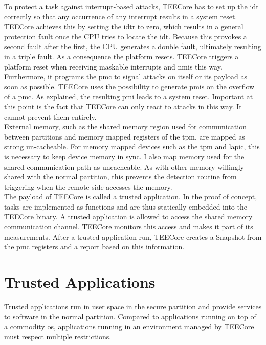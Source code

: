 To protect a task against interrupt-based attacks, TEECore has to set up the
\gls{idt} correctly so that any occurrence of any interrupt results in a system
reset. TEECore achieves this by setting the \gls{idtr} to zero, which results in
a general protection fault once the CPU tries to locate the \gls{idt}. Because
this provokes a second fault after the first, the CPU generates a double fault,
ultimately resulting in a triple fault. As a consequence the platform resets.
TEECore triggers a platform reset when receiving maskable interrupts and
\glspl{nmi} this way. Furthermore, it programs the \gls{pmc} to signal attacks
on itself or its payload as soon as possible. TEECore uses the possibility to
generate \glspl{pmi} on the overflow of a \gls{pmc}. As explained, the resulting
\gls{pmi} leads to a system reset. Important at this point is the fact that
TEECore can only react to attacks in this way. It cannot prevent them
entirely.\\

External memory, such as the shared memory region used for communication between
partitions and memory mapped registers of the \gls{tpm}, are mapped as strong
un-cacheable. For memory mapped devices such as the \gls{tpm} and \gls{lapic},
this is necessary to keep device memory in sync. I also map memory used for the
shared communication path as uncacheable. As with other memory willingly shared
with the normal partition, this prevents the detection routine from triggering
when the remote side accesses the memory.\\

The payload of TEECore is called a trusted application. In the proof of concept,
tasks are implemented as functions and are thus statically embedded into the
TEECore binary. A trusted application is allowed to access the shared memory
communication channel. TEECore monitors this access and makes it part of its
measurements. After a trusted application run, TEECore creates a Snapshot from
the \gls{pmc} registers and a report based on this information.

\section{Trusted Applications}
\label{sec:30:tee_apps}
Trusted applications run in user space in the secure partition and provide
services to software in the normal partition. Compared to applications running
on top of a commodity \gls{os}, applications running in an environment managed
by TEECore must respect multiple restrictions.\\

